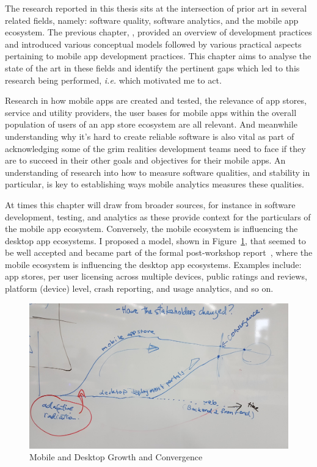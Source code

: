 The research reported in this thesis sits at the intersection of prior art in several related fields, namely: software quality, software analytics, and the mobile app ecosystem. %
The previous chapter, , provided an overview of development practices and introduced various conceptual models followed by various practical aspects pertaining to mobile app development practices.  
This chapter aims to analyse the state of the art in these fields and identify the pertinent gaps which led to this research being performed, \emph{i.e.} which motivated me to act.  

Research in how mobile apps are created and tested, the relevance of app stores, service and utility providers, the user bases for mobile apps within the overall population of users of an app store ecosystem are all relevant. And meanwhile understanding why it's hard to create reliable software is also vital as part of acknowledging some of the grim realities development teams need to face if they are to succeed in their other goals and objectives for their mobile apps. An understanding of research into how to measure software qualities, and stability in particular, is key to establishing ways mobile analytics measures these qualities. 

At times this chapter will draw from broader sources, for instance in software development, testing, and analytics as these provide context for the particulars of the mobile app ecosystem. Conversely, the mobile ecosystem is influencing the desktop app ecosystems. I proposed a model, shown in Figure~\ref{fig:my_shonan_hysteresis_sketch}, that seemed to be well accepted and became part of the formal post-workshop report~, where the mobile ecosystem is influencing the desktop app ecosystems. Examples include: app stores, per user licensing across multiple devices, public ratings and reviews, platform (device) level, crash reporting, and usage analytics, and so on.

\begin{figure}
    \centering
    \includegraphics[width=\linewidth]{images/nii-shonan-workshop-152/shonan_hysteresis_diagram_20191210_132528.jpg}
    \caption{Mobile and Desktop Growth and Convergence}
    \label{fig:my_shonan_hysteresis_sketch}
\end{figure}

